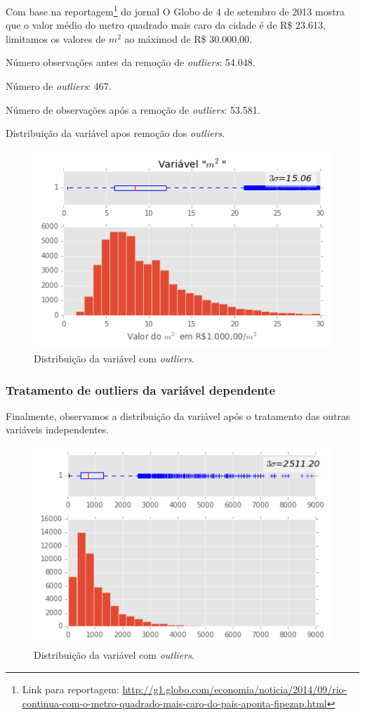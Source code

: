  Com base na reportagem\footnote{Link para reportagem: \url{http://g1.globo.com/economia/noticia/2014/09/rio-continua-com-o-metro-quadrado-mais-caro-do-pais-aponta-fipezap.html}} do jornal O Globo de 4 de setembro de 2013 mostra que o valor médio do metro quadrado mais caro da cidade é de R\$ 23.613, limitamos os valores de $ m^2 $ ao máximod de R\$ 30.000,00.
 
 Número observações antes da remoção de \textit{outliers}: 54.048. 
 
 Número de \textit{outliers}: 467.
 
 Número de observações após a remoção de \textit{outliers}: 53.581.
 
 Distribuição da variável  apos remoção dos \textit{outliers}.
 
 \begin{figure}[H]
 	\centering
 	\includegraphics[width=0.8\linewidth]{img/var_m2_boxhist_depois}
 	\caption{Distribuição da variável  com \textit{outliers}.}
 	\label{fig:var_m2_boxhist_depois}
 \end{figure}
 
 
  \subsubsection{Tratamento de outliers da variável dependente }
  
  
  Finalmente, observamos a distribuição da variável  após o tratamento das outras variáveis independentes.
  
  
  \begin{figure}[H]
  	\centering
  	\includegraphics[width=0.8\linewidth]{img/var_preco_boxhist_antes}
  	\caption{Distribuição da variável  com \textit{outliers}.}
  	\label{fig:var_preco_boxhist_antes}
  \end{figure}
  
